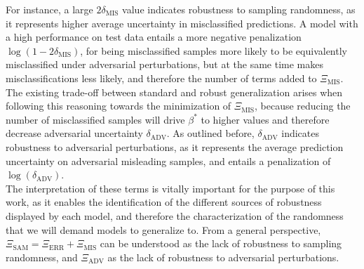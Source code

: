 For instance, a large $2 \delta_{\text{MIS}}$ value indicates robustness to sampling randomness, as it
represents higher average uncertainty in misclassified predictions. A model with a high performance on 
test data entails a more negative penalization $\log(1 - 2 \delta_{\text{MIS}})$, for being misclassified 
samples more likely to be equivalently misclassified under adversarial perturbations, but at
the same time makes misclassifications less likely, and therefore the number of terms added to
$\Xi_{\text{MIS}}$. The existing trade-off between standard and robust generalization arises when 
following this reasoning towards the minimization of $\Xi_{\text{MIS}}$, because reducing the number of 
misclassified samples will drive $\beta^{*}$ to higher values and therefore decrease adversarial 
uncertainty $\delta_{\text{ADV}}$. As outlined before, $\delta_{\text{ADV}}$ indicates 
robustness to adversarial perturbations, as it represents the average prediction uncertainty on adversarial 
misleading samples, and entails a penalization of $\log(\delta_{\text{ADV}})$. \\

The interpretation of these terms is vitally important for the purpose of this work, as it enables
the identification of the different sources of robustness displayed by each model, and therefore
the characterization of the randomness that we will demand models to generalize to. From a general 
perspective, $\Xi_{\text{SAM}} = \Xi_{\text{ERR}} + \Xi_{\text{MIS}}$ can be understood as the lack of robustness
to sampling randomness, and $\Xi_{\text{ADV}}$ as the lack of robustness to adversarial perturbations. \\


